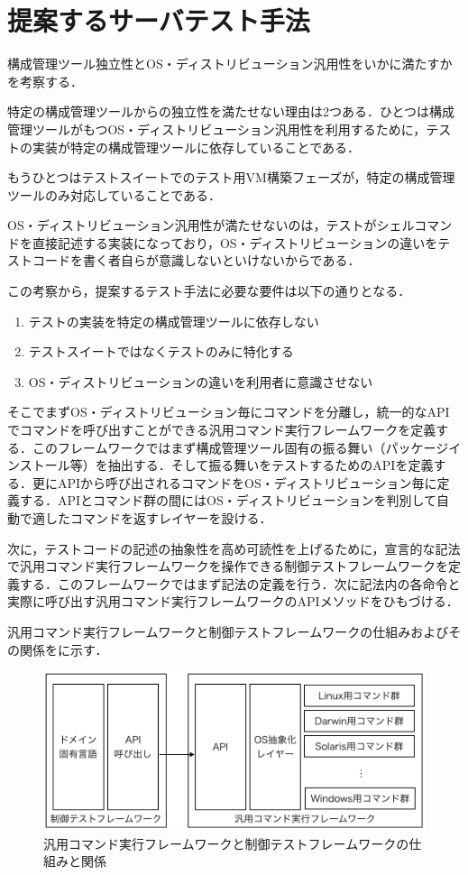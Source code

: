 \section{提案するサーバテスト手法}

構成管理ツール独立性とOS・ディストリビューション汎用性をいかに満たすかを考察する．

特定の構成管理ツールからの独立性を満たせない理由は2つある．ひとつは構成管理ツールがもつOS・ディストリビューション汎用性を利用するために，テストの実装が特定の構成管理ツールに依存していることである．

もうひとつはテストスイートでのテスト用VM構築フェーズが，特定の構成管理ツールのみ対応していることである．

OS・ディストリビューション汎用性が満たせないのは，テストがシェルコマンドを直接記述する実装になっており，OS・ディストリビューションの違いをテストコードを書く者自らが意識しないといけないからである．

この考察から，提案するテスト手法に必要な要件は以下の通りとなる．

\begin{enumerate}
  \item テストの実装を特定の構成管理ツールに依存しない
  \item テストスイートではなくテストのみに特化する
  \item OS・ディストリビューションの違いを利用者に意識させない
\end{enumerate}

そこでまずOS・ディストリビューション毎にコマンドを分離し，統一的なAPIでコマンドを呼び出すことができる汎用コマンド実行フレームワークを定義する．このフレームワークではまず構成管理ツール固有の振る舞い（パッケージインストール等）を抽出する．そして振る舞いをテストするためのAPIを定義する．更にAPIから呼び出されるコマンドをOS・ディストリビューション毎に定義する．APIとコマンド群の間にはOS・ディストリビューションを判別して自動で適したコマンドを返すレイヤーを設ける．

次に，テストコードの記述の抽象性を高め可読性を上げるために，宣言的な記法で汎用コマンド実行フレームワークを操作できる制御テストフレームワークを定義する．このフレームワークではまず記法の定義を行う．次に記法内の各命令と実際に呼び出す汎用コマンド実行フレームワークのAPIメソッドをひもづける．

汎用コマンド実行フレームワークと制御テストフレームワークの仕組みおよびその関係をに示す．

\begin{figure}[tb]
  \includegraphics{framework-overview.png}
  \caption{汎用コマンド実行フレームワークと制御テストフレームワークの仕組みと関係}
  \label{fig:framework}
\end{figure}

